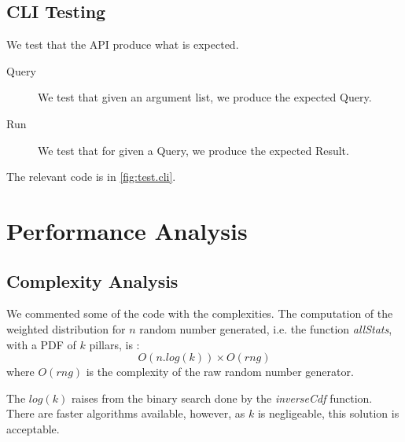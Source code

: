 \documentclass[12pt,a4paper,titlepage]{article}
\begin{document}
\subsection{CLI Testing}
We test that the API produce what is expected.
\begin{description}
	\item [Query]
	We test that given an argument list, we produce the expected
	Query.
	\item[Run]
	We test that for given a Query, we produce the expected Result.
\end{description}
The relevant code is in \autoref{fig:test.cli}.
\section{Performance Analysis}
\label{sec:perf}

\subsection{Complexity Analysis}
We commented some of the code with the complexities.
The computation of the weighted distribution for $n$ random number generated, 
i.e. the function \emph{allStats}, with a PDF of $k$ pillars, is :
\[
	O(n . log (k) ) \times O( rng )
\]
where $O(rng)$ is the complexity of the raw random number generator.

The $log(k)$ raises from the binary search done by the \emph{inverseCdf}
function. There are faster algorithms available, however, as $k$ is negligeable,
this solution is acceptable.
\end{document}
